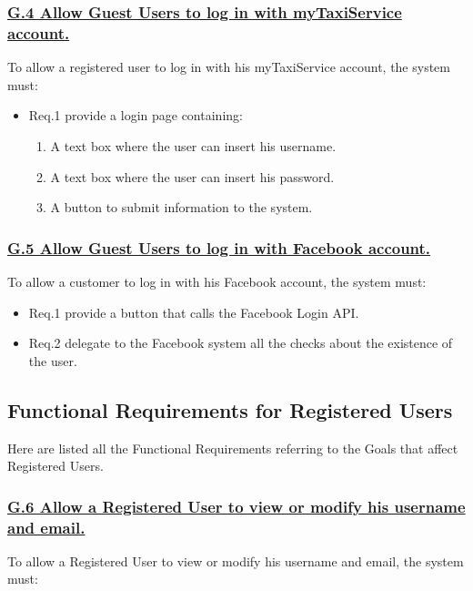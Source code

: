 			\subsubsection{\lbrack \hyperref[sec:g4]{G.4 Allow Guest Users to log in with myTaxiService account.}\rbrack}\label{sec:frs4}
			To allow a registered user to log in with his myTaxiService account, the system must:

				\begin{itemize}
					\item \lbrack Req.1\rbrack \label{sec:fr1_g4} provide a login page containing:
						\begin{enumerate}
							\item A text box where the user can insert his username.
							\item A text box where the user can insert his password.
							\item A button to submit information to the system.
						\end{enumerate}
				\end{itemize}

			\subsubsection{\lbrack \hyperref[sec:g5]{G.5 Allow Guest Users to log in with Facebook account.}\rbrack}\label{sec:frs5}
			To allow a customer to log in with his Facebook account, the system must:

				\begin{itemize}
					\item \lbrack Req.1\rbrack \label{sec:fr1_g5} provide a button that calls the Facebook Login API.
					\item \lbrack Req.2\rbrack \label{sec:fr2_g5} delegate to the Facebook system all the checks about the existence of the user.
				\end{itemize}

		\subsection{Functional Requirements for Registered Users}
		Here are listed all the Functional Requirements referring to the Goals that affect Registered Users.

			\subsubsection{\lbrack \hyperref[sec:g6]{G.6 Allow a Registered User to view or modify his username and email.}\rbrack}\label{sec:frs6}
			To allow a Registered User to view or modify his username and email, the system must:

